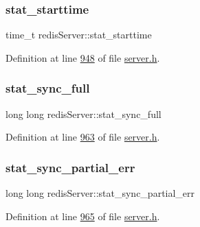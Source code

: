 \mbox{\label{structredisServer_afbaae6cb789dc59f1673f7c911812996}} 
\subsubsection{\texorpdfstring{stat\+\_\+starttime}{stat\_starttime}}
{\footnotesize\ttfamily time\+\_\+t redis\+Server\+::stat\+\_\+starttime}



Definition at line \hyperlink{server_8h_source_l00948}{948} of file \hyperlink{server_8h_source}{server.\+h}.

\mbox{\label{structredisServer_a6cf4c1f948669f99bc84fd72a9e852ec}} 
\subsubsection{\texorpdfstring{stat\+\_\+sync\+\_\+full}{stat\_sync\_full}}
{\footnotesize\ttfamily long long redis\+Server\+::stat\+\_\+sync\+\_\+full}



Definition at line \hyperlink{server_8h_source_l00963}{963} of file \hyperlink{server_8h_source}{server.\+h}.

\mbox{\label{structredisServer_a6edd8cb05ca59f2d1532888de1f187d2}} 
\subsubsection{\texorpdfstring{stat\+\_\+sync\+\_\+partial\+\_\+err}{stat\_sync\_partial\_err}}
{\footnotesize\ttfamily long long redis\+Server\+::stat\+\_\+sync\+\_\+partial\+\_\+err}



Definition at line \hyperlink{server_8h_source_l00965}{965} of file \hyperlink{server_8h_source}{server.\+h}.

